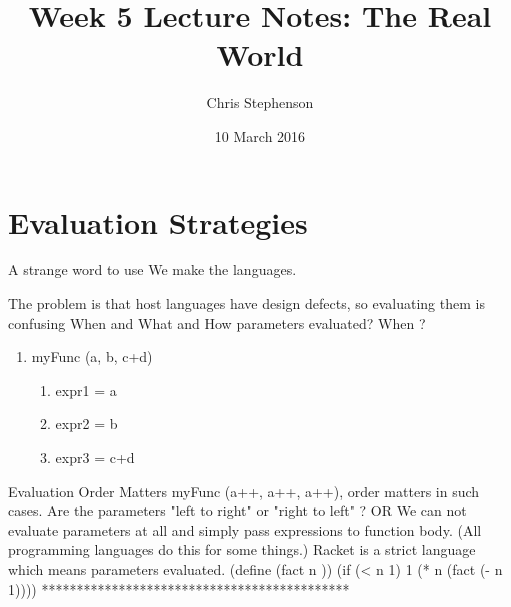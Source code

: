 \documentclass{article}
\title{Week 5 Lecture Notes: The Real World}
\author{Chris Stephenson}
\date{10 March 2016}
\begin{document}
\maketitle

\section{Evaluation Strategies}

\newline A strange word to use 
\newline We make the languages. 
\newline


The problem is that host languages have design defects, so evaluating them is confusing
\newline \newline
When and What and How parameters evaluated?
\newline \newline
When ?
\begin{enumerate}
    \item myFunc (a, b, c+d)
    \begin{enumerate}
        \item expr1 = a
        \item expr2 = b
        \item expr3 = c+d
    \end{enumerate}
\end{enumerate}
\newline
Evaluation Order Matters\newline
\newline
myFunc (a++, a++, a++), order matters in such cases.
\newline \newline
Are the parameters "left to right" or "right to left" ? 
\newline \newline
OR  We can not evaluate parameters at all and simply pass expressions to function body.
(All programming languages do this for some things.)
\newline \newline
Racket is a strict language which means parameters evaluated.
\newline \newline
(define (fact n ))
 (if (< n 1) 1 (* n (fact (- n 1))))
\newline \newline
********************************************
\newline
\end{document}

